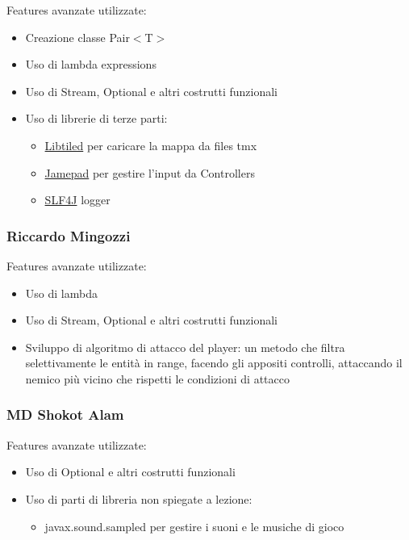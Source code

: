 \documentclass[a4paper,12pt]{report}
\begin{document}
Features avanzate utilizzate:

\begin{itemize}
    \item Creazione classe Pair$<$T$>$
    \item Uso di lambda expressions
    \item Uso di Stream, Optional e altri costrutti funzionali
    \item Uso di librerie di terze parti:
    \begin{itemize}
        \item \href{https://github.com/csueiras/libtiled-java}{Libtiled} per caricare la mappa da files tmx
        \item \href{https://github.com/williamahartman/Jamepad}{Jamepad} per gestire l'input da Controllers
        \item \href{https://github.com/qos-ch/slf4j}{SLF4J} logger
    \end{itemize}
\end{itemize}

\subsubsection{Riccardo Mingozzi}

Features avanzate utilizzate:

\begin{itemize}
    \item Uso di lambda
    \item Uso di Stream, Optional e altri costrutti funzionali
    \item Sviluppo di algoritmo di attacco del player: un metodo che filtra selettivamente le entità in range, facendo gli appositi controlli, attaccando il nemico più vicino che rispetti le condizioni di attacco
\end{itemize}

\subsubsection{MD Shokot Alam}

Features avanzate utilizzate:

\begin{itemize}
    \item Uso di Optional e altri costrutti funzionali
    \item Uso di parti di libreria non spiegate a lezione:
    \begin{itemize}
        \item javax.sound.sampled per gestire i suoni e le musiche di gioco
    \end{itemize}
\end{itemize}
\end{document}
